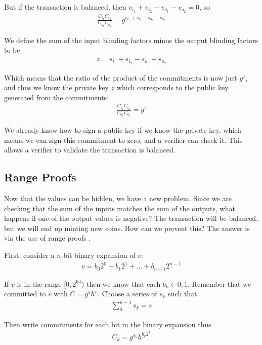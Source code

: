 \documentclass{article}
\begin{document}
But if the transaction is balanced, then $v_{i_1} + v_{i_2} - v_{o_1} - v_{o_2} = 0$, so
\begin{align}
  \frac{C_{i_1} C_{i_2}}{C_{o_1} C_{o_2}} = g^{s_{i_1} + s_{i_2} - s_{o_1} - s_{o_2}}
\end{align}

We define the sum of the input blinding factors minus the output blinding factors to be
\begin{align}
  z = s_{i_1} + s_{i_2} - s_{o_1} - s_{o_2}
\end{align}

Which means that the ratio of the product of the commitments is now just $g^z$, and thus we know the private key $z$ which corresponds to the public key generated from the commitments:
\begin{align}
  \frac{C_{i_1} C_{i_2}}{C_{o_1} C_{o_2}} = g^z
\end{align}

We already know how to sign a public key if we know the private key, which means we can sign this commitment to zero, and a verifier can check it.  This allows a verifier to validate the transaction is balanced.


\subsection{Range Proofs}

Now that the values can be hidden, we have a new problem.  Since we are checking that the sum of the inputs matches the sum of the outputs, what happens if one of the output values is negative?  The transaction will be balanced, but we will end up minting new coins.  How can we prevent this?  The answer is via the use of range proofs \cite{ringct}.

First, consider a $n$-bit binary expansion of $v$:
\begin{align}
  v = b_0 2^0 + b_1 2^1 + ... + b_{n-1} 2^{n-1}
\end{align}

If $v$ is in the range $[0, 2^{64})$ then we know that each $b_k \in {0, 1}$.  Remember that we committed to $v$ with $C = g^s h^v$.  Choose a series of $s_k$ such that
\begin{align}
  \sum_0^{n-1} s_k = s 
\end{align}

Then write commitments for each bit in the binary expansion thus
\begin{align}
  C_k = g^{s_k} h^{b_k 2^k}
\end{align}
\end{document}
